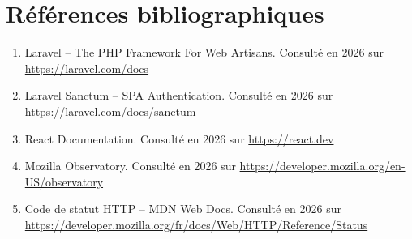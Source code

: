 \chapter*{R\'ef\'erences bibliographiques}

\begin{enumerate}
  \item Laravel -- The PHP Framework For Web Artisans. Consult\'e en 2026 sur
    \url{https://laravel.com/docs}
  \item Laravel Sanctum -- SPA Authentication. Consult\'e en 2026 sur
    \url{https://laravel.com/docs/sanctum}
  \item React Documentation. Consult\'e en 2026 sur \url{https://react.dev}
  \item Mozilla Observatory. Consult\'e en 2026 sur \url{https://developer.mozilla.org/en-US/observatory}
  \item Code de statut HTTP -- MDN Web Docs. Consult\'e en 2026 sur
    \url{https://developer.mozilla.org/fr/docs/Web/HTTP/Reference/Status}
\end{enumerate}
